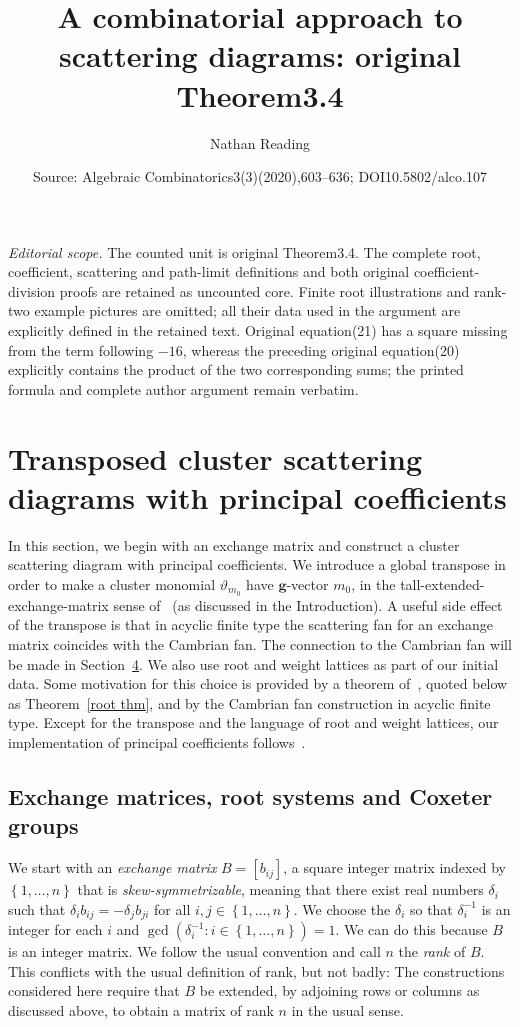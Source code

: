 \documentclass[10pt,a4paper]{amsart}
\title[Affine limiting scattering wall]{A combinatorial approach to scattering diagrams: original Theorem3.4}
\author{Nathan Reading}
\date{Source: Algebraic Combinatorics3(3)(2020),603--636; DOI10.5802/alco.107}
\theoremstyle{definition}
\newcommand{\newword}[1]{\emph{#1}}
\newcommand{\thet}{\vartheta}
\newcommand{\set}[1]{{\left\lbrace #1 \right\rbrace}}
\newcommand{\g}{\mathbf{g}}
\begin{document}
\maketitle
\noindent\textit{Editorial scope.} The counted unit is original Theorem3.4. The complete root, coefficient, scattering and path-limit definitions and both original coefficient-division proofs are retained as uncounted core. Finite root illustrations and rank-two example pictures are omitted; all their data used in the argument are explicitly defined in the retained text. Original equation(21) has a square missing from the term following $-16$, whereas the preceding original equation(20) explicitly contains the product of the two corresponding sums; the printed formula and complete author argument remain verbatim.
\setcounter{section}{1}
\section{Transposed cluster scattering diagrams with principal coefficients}\label{transp sec}
In this section, we begin with an exchange matrix and construct a cluster scattering diagram with principal coefficients.
We introduce a global transpose in order to make a cluster monomial $\thet_{m_0}$ have $\g$-vector $m_0$, in the tall-extended-exchange-matrix sense of~\cite{ca4} (as discussed in the Introduction).
A useful side effect of the transpose is that in acyclic finite type the scattering fan for an exchange matrix coincides with the Cambrian fan.
The connection to the Cambrian fan will be made in Section~\href{https://alco.centre-mersenne.org/articles/10.5802/alco.107/}{4}.
We also use root and weight lattices as part of our initial data.
Some motivation for this choice is provided by a theorem of~\cite{Bridgeland,GHKK}, quoted below as Theorem~\ref{root thm}, and by the Cambrian fan construction in acyclic finite type.
Except for the transpose and the language of root and weight lattices, our implementation of principal coefficients follows~\cite[Appendix~B]{GHKK}.

\subsection{Exchange matrices, root systems and Coxeter groups}\label{back sec}
We start with an \newword{exchange matrix} $B=[b_{ij}]$, a square integer matrix indexed by $\set{1,\ldots,n}$ that is \newword{skew-symmetrizable}, meaning that there exist real numbers $\delta_i$ such that $\delta_ib_{ij}=-\delta_jb_{ji}$ for all $i,j\in\set{1,\ldots,n}$.
We choose the $\delta_i$ so that $\delta_i^{-1}$ is an integer for each $i$ and $\gcd(\delta_i^{-1}:i\in\set{1,\ldots,n})=1$.
We can do this because $B$ is an integer matrix.
We follow the usual convention and call $n$ the \newword{rank} of $B$.
This conflicts with the usual definition of rank, but not badly:
The constructions considered here require that $B$ be extended, by adjoining rows or columns as discussed above, to obtain a matrix of rank $n$ in the usual sense.
\end{document}
